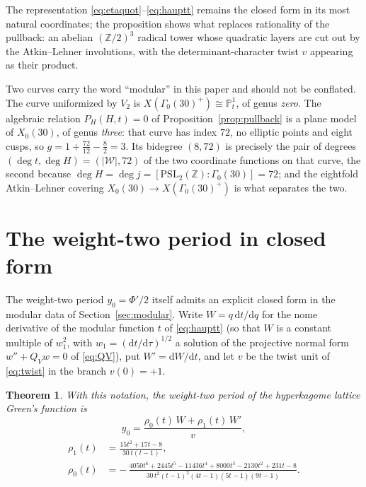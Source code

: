 \documentclass[cntp]{ipart}
\newcommand{\rmd}{\mathrm{d}}
\theoremstyle{plain}
\newtheorem{thm}{Theorem}[section]
\theoremstyle{remark}
\begin{document}
The representation \eqref{eq:etaquot}--\eqref{eq:hauptt} remains the closed form in its most natural
coordinates; the proposition shows what replaces rationality of the pullback: an abelian $(\mathbb{Z}/2)^3$
radical tower whose quadratic layers are cut out by the Atkin--Lehner involutions, with the
determinant-character twist $v$ appearing as their product.

Two curves carry the word ``modular'' in this paper and should not be conflated. The curve
uniformized by $V_2$ is $X(\Gamma_0(30)^+)\cong\mathbb{P}^1_t$, of genus \emph{zero}. The algebraic
relation $P_H(H,t)=0$ of Proposition~\ref{prop:pullback} is a plane model of $X_0(30)$, of genus
\emph{three}: that curve has index $72$, no elliptic points and eight cusps, so
$g=1+\tfrac{72}{12}-\tfrac82=3$. Its bidegree $(8,72)$ is precisely the pair of degrees
$(\deg t,\deg H)=(|\mathcal{W}|,72)$ of the two coordinate functions on that curve, the second
because $\deg H=\deg j=[\mathrm{PSL}_2(\mathbb{Z}):\Gamma_0(30)]=72$; and the eightfold
Atkin--Lehner covering $X_0(30)\to X(\Gamma_0(30)^+)$ is what separates the two.

\section{The weight-two period in closed form}
\label{sec:y0closed}

The weight-two period $y_0=\Phi'/2$ itself admits an explicit closed form in the modular data of
Section~\ref{sec:modular}. Write $W=q\,\rmd t/\rmd q$ for the nome derivative of the modular function $t$ of
\eqref{eq:hauptt} (so that $W$ is a constant multiple of $w_1^2$, with $w_1=(\rmd t/\rmd\tau)^{1/2}$ a
solution of the projective normal form $w''+Q_Vw=0$ of \eqref{eq:QV}), put $W'=\rmd W/\rmd t$, and let
$v$ be the twist unit of \eqref{eq:twist} in the branch $v(0)=+1$.

\begin{thm}\label{thm:y0}
With this notation, the weight-two period of the hyperkagome lattice Green's function is
\begin{equation}
y_0=\frac{\rho_0(t)\,W+\rho_1(t)\,W'}{v},
\label{eq:y0closed}
\end{equation}
\begin{equation}
\begin{split}
\rho_1(t)&=\frac{15t^2+17t-8}{30\,t(t-1)},\\[4pt]
\rho_0(t)&=-\,\frac{4050t^6+2445t^5-11436t^4+8000t^3-2130t^2+231t-8}
{30\,t^2(t-1)^2(4t-1)(5t-1)(9t-1)}.
\end{split}
\label{eq:y0rhos}
\end{equation}
\end{thm}
\end{document}
